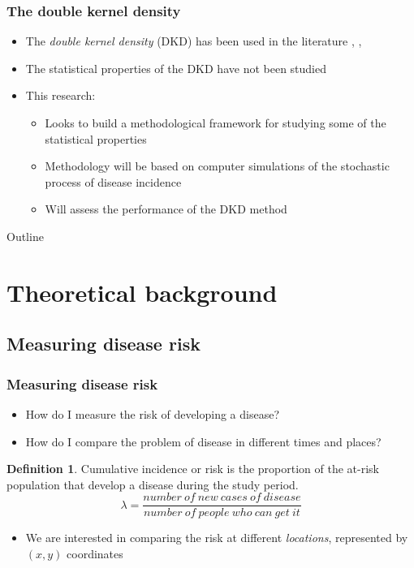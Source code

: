 \documentclass[notheorems]{beamer}
\theoremstyle{definition}
\newtheorem{definition}{Definition}
\theoremstyle{example}
\begin{document}
\begin{frame}\frametitle{The double kernel density}
    \begin{itemize}
        \item The \emph{double kernel density} (DKD) has been used in the literature \cite{kloog2009using}, \cite{portnov2009studying}, \cite{zusman2012residential}
        \item The statistical properties of the DKD have not been studied
        \item This research:
        \begin{itemize}
            \item Looks to build a methodological framework for studying some of the statistical properties
            \item Methodology will be based on computer simulations of the stochastic process of disease incidence
            \item Will assess the performance of the DKD method
        \end{itemize}
    \end{itemize}
\end{frame}

\begin{frame}{Outline}
\tableofcontents[hideallsubsections]
\end{frame}

\section{Theoretical background}

\subsection{Measuring disease risk}
\begin{frame}\frametitle{Measuring disease risk}
    \begin{itemize}
        \item How do I measure the risk of developing a disease?
        \item How do I compare the problem of disease in different times and places?
    \end{itemize}
    \begin{definition}
        \alert{Cumulative incidence} or \alert{risk} is the proportion of the at-risk population that develop a disease during the study period.
        \begin{equation*}
            \lambda = \frac{number~of~new~cases~of~disease}{number~of~people~who~can~get~it}
        \end{equation*}
        \cite{bonita2006basic}
    \end{definition}
    \begin{itemize}
        \item We are interested in comparing the risk at different \emph{locations}, represented by $(x,y)$ coordinates
    \end{itemize}
\end{frame}
\end{document}

